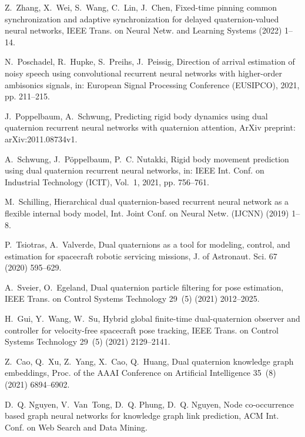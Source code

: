 \documentclass[3p, preprint, twocolumn]{elsarticle}
\begin{document}
\begin{thebibliography}{10}
Z.~Zhang, X.~Wei, S.~Wang, C.~Lin, J.~Chen, Fixed-time pinning common
  synchronization and adaptive synchronization for delayed quaternion-valued
  neural networks, IEEE Trans. on Neural Netw. and Learning Systems (2022)
  1--14.

N.~Poschadel, R.~Hupke, S.~Preihs, J.~Peissig, Direction of arrival estimation
  of noisy speech using convolutional recurrent neural networks with
  higher-order ambisonics signals, in: European Signal Processing Conference
  (EUSIPCO), 2021, pp. 211--215.

J.~Poppelbaum, A.~Schwung, Predicting rigid body dynamics using dual quaternion
  recurrent neural networks with quaternion attention, ArXiv preprint:
  arXiv:2011.08734v1.

A.~Schwung, J.~Pöppelbaum, P.~C. Nutakki, Rigid body movement prediction using
  dual quaternion recurrent neural networks, in: {IEEE} Int. Conf. on
  Industrial Technology ({ICIT}), Vol.~1, 2021, pp. 756--761.

M.~Schilling, Hierarchical dual quaternion-based recurrent neural network as a
  flexible internal body model, Int. Joint Conf. on Neural Netw. (IJCNN) (2019)
  1--8.

P.~Tsiotras, A.~Valverde, Dual quaternions as a tool for modeling, control, and
  estimation for spacecraft robotic servicing missions, J. of Astronaut. Sci.
  67 (2020) 595–629.

A.~Sveier, O.~Egeland, Dual quaternion particle filtering for pose estimation,
  IEEE Trans. on Control Systems Technology 29~(5) (2021) 2012--2025.

H.~Gui, Y.~Wang, W.~Su, Hybrid global finite-time dual-quaternion observer and
  controller for velocity-free spacecraft pose tracking, IEEE Trans. on Control
  Systems Technology 29~(5) (2021) 2129--2141.

Z.~Cao, Q.~Xu, Z.~Yang, X.~Cao, Q.~Huang, Dual quaternion knowledge graph
  embeddings, Proc. of the {AAAI} Conference on Artificial Intelligence 35~(8)
  (2021) 6894--6902.

D.~Q. Nguyen, V.~Van~Tong, D.~Q. Phung, D.~Q. Nguyen, Node co-occurrence based
  graph neural networks for knowledge graph link prediction, {ACM} Int. Conf.
  on Web Search and Data Mining.


\end{thebibliography}
\end{document}
